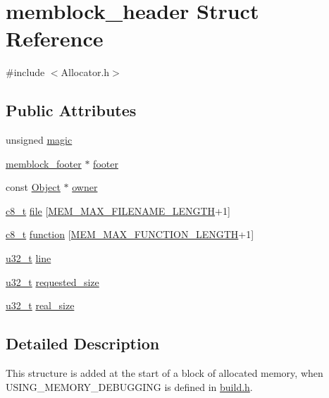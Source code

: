 \section{memblock\-\_\-header Struct Reference}
\label{structmemblock__header}


{\ttfamily \#include $<$Allocator.\-h$>$}

\subsection*{Public Attributes}
\begin{DoxyCompactItemize}
\item 
unsigned \hyperlink{structmemblock__header_a10ebc950edccb690a784aceb6362d696}{magic}
\item 
\hyperlink{structmemblock__footer}{memblock\-\_\-footer} $\ast$ \hyperlink{structmemblock__header_ab9999ece91b34ae2742865b27791b374}{footer}
\item 
const \hyperlink{class_object}{Object} $\ast$ \hyperlink{structmemblock__header_a4a1f4790e308d4211fee21b6eceeebc4}{owner}
\item 
\hyperlink{types_8h_a93d4fa6fb79d31926edb1d51e2f502d2}{c8\-\_\-t} \hyperlink{structmemblock__header_aafc71ef9dade058f65a814a1b2e3ffd2}{file} \mbox{[}\hyperlink{build_8h_ac811ed79333c5131bf74f609b0b67fcf}{M\-E\-M\-\_\-\-M\-A\-X\-\_\-\-F\-I\-L\-E\-N\-A\-M\-E\-\_\-\-L\-E\-N\-G\-T\-H}+1\mbox{]}
\item 
\hyperlink{types_8h_a93d4fa6fb79d31926edb1d51e2f502d2}{c8\-\_\-t} \hyperlink{structmemblock__header_acd1e57226698ef61dc9ffb3a55dcd7e2}{function} \mbox{[}\hyperlink{build_8h_af15f994b428f827c19ae31d1df47d7ca}{M\-E\-M\-\_\-\-M\-A\-X\-\_\-\-F\-U\-N\-C\-T\-I\-O\-N\-\_\-\-L\-E\-N\-G\-T\-H}+1\mbox{]}
\item 
\hyperlink{types_8h_a0c0a490ab7fa397be6c764a935cc5ea4}{u32\-\_\-t} \hyperlink{structmemblock__header_a4d7851e5d73d69d982776d281c222b1d}{line}
\item 
\hyperlink{types_8h_a0c0a490ab7fa397be6c764a935cc5ea4}{u32\-\_\-t} \hyperlink{structmemblock__header_a46ddeb376649b481b8cb72fe59e90b1d}{requested\-\_\-size}
\item 
\hyperlink{types_8h_a0c0a490ab7fa397be6c764a935cc5ea4}{u32\-\_\-t} \hyperlink{structmemblock__header_a07b25257ab31ff95fa23911214371462}{real\-\_\-size}
\end{DoxyCompactItemize}


\subsection{Detailed Description}
This structure is added at the start of a block of allocated memory, when U\-S\-I\-N\-G\-\_\-\-M\-E\-M\-O\-R\-Y\-\_\-\-D\-E\-B\-U\-G\-G\-I\-N\-G is defined in \hyperlink{build_8h}{build.\-h}. 

